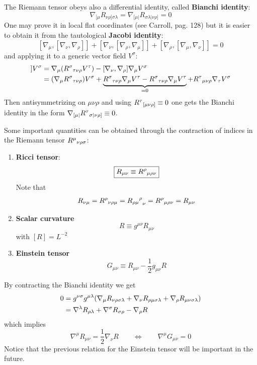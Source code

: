 \documentclass[../main/main.tex]{subfiles}
\begin{document}
The Riemann tensor obeys also a differential identity, called \textbf{Bianchi identity}:
\begin{equation}\boxed{
\nabla_{[\mu}R_{\nu\rho]\sigma\lambda}=\nabla_{[\mu\vert}R_{\sigma\lambda\vert\nu\rho]}=0
}\end{equation}
One may prove it in local flat coordinates (see Carroll, pag. 128) but it is easier to obtain it from the tautological \textbf{Jacobi identity}:
\[[\nabla_\mu,[\nabla_\nu,\nabla_\rho]]+[\nabla_\nu,[\nabla_\rho,\nabla_\mu]]+[\nabla_\rho,[\nabla_\mu,\nabla_\nu]]=0\]
and applying it to a generic vector field $V^\sigma$:
\begin{align*}
[\nabla_\mu,[\nabla_\nu,\nabla_\rho]]V^\sigma
&=\nabla_\mu(\curv\sigma\tau\nu\rho V^\tau)-[\nabla_\nu,\nabla_\rho]\nabla_\mu V^\sigma\\
&=(\nabla_\mu\curv\sigma\tau\nu\rho)V^\sigma+\underbrace{\curv\sigma\tau\nu\rho\nabla_\mu V^\tau-\curv\sigma\tau\nu\rho\nabla_\mu V^\tau}_{=0}+\curv\tau\mu\nu\rho\nabla_\tau V^\sigma
\end{align*}
Then antisymmetrizing on $\mu\nu\rho$ and using ${{R}^{\tau}}_{[\mu \nu \rho]}\equiv0$ one gets the Bianchi identity in the form $\nabla_{[\mu\vert}{{R}^{\tau}}_{\sigma \vert\nu \rho]}\equiv0$.

Some important quantities can be obtained through the contraction of indices in the Riemann tensor ${{R}^{\mu}}_{\nu \rho \sigma}$:
\begin{enumerate}[label=(\alph*)]
\item \textbf{Ricci tensor}:
\begin{equation}\boxed{
 R_{\mu\nu}\equiv{{R}^{\rho}}_{\mu \rho \nu}
}\end{equation}
Note that
\[ R_{\nu\mu}={{R}^{\rho}}_{\nu \rho \mu}={{R_{\rho\mu}}^\rho}_\nu={{R}^{\rho}}_{\mu \rho \nu}= R_{\mu\nu}\]
\item\textbf{Scalar curvature}
\begin{equation}\boxed{
 R\equiv g^{\mu\nu}R_{\mu\nu}
}\end{equation}
with $[R]=L^{-2}$
\item\textbf{Einstein tensor}
\begin{equation}\boxed{
 G_{\mu\nu}\equiv R_{\mu\nu}-\frac12g_{\mu\nu}R
}\end{equation}
\end{enumerate}

By contracting the Bianchi identity we get
\begin{align*}
0&=g^{\nu \sigma}g^{\mu \lambda}(\nabla_\mu R_{\nu\rho\sigma\lambda}+\nabla_\nu R_{\rho\mu\sigma\lambda}+\nabla_\rho R_{\mu\nu\sigma\lambda})\\
&=\nabla^\lambda R_{\rho\lambda}+\nabla^\sigma R_{\sigma\rho}-\nabla_\rho R
\end{align*}
which implies
\begin{equation}\boxed{
\nabla^\mu R_{\mu\nu}=\frac12\nabla_\nu R\qquad\Leftrightarrow\qquad\nabla^\mu G_{\mu\nu}=0
}\end{equation}
Notice that the previous relation for the Einstein tensor will be important in the future. 
\end{document}
